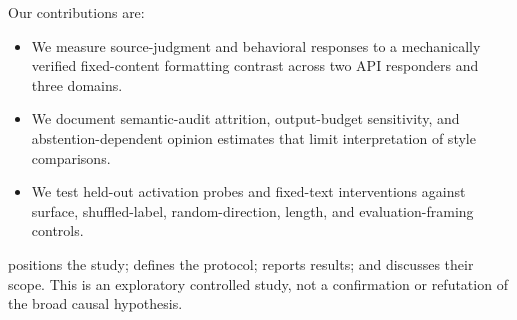 Our contributions are:
\begin{itemize}[leftmargin=*,itemsep=0pt,topsep=0pt]
\item We measure source-judgment and behavioral responses to a mechanically verified fixed-content formatting contrast across two API responders and three domains.
\item We document semantic-audit attrition, output-budget sensitivity, and abstention-dependent opinion estimates that limit interpretation of style comparisons.
\item We test held-out activation probes and fixed-text interventions against surface, shuffled-label, random-direction, length, and evaluation-framing controls.
\end{itemize}
 positions the study;  defines the protocol;  reports results; and  discusses their scope. This is an exploratory controlled study, not a confirmation or refutation of the broad causal hypothesis.


